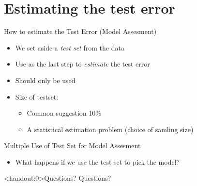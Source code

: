 \documentclass[10pt]{beamer}
\begin{document}
\section{Estimating the test error}

\begin{frame}{How to estimate the Test Error (Model Assesment)}

\begin{itemize}
\item We set aside a \emph{test set} from the data
\item Use as the last step to \emph{estimate} the test error
\item Should only be used \pause
\item Size of testset:
\begin{itemize}
\item Common suggestion 10\%
\item A statistical estimation problem (choice of samling size)
\end{itemize}
\end{itemize}

\end{frame}


\begin{frame}{Multiple Use of Test Set for Model Assesment}

\begin{itemize}
\item What happens if we use the test set to pick the model?
\end{itemize}

\end{frame}

\begin{frame}<handout:0>{Questions?}
Questions?
\end{frame}



\end{document}
